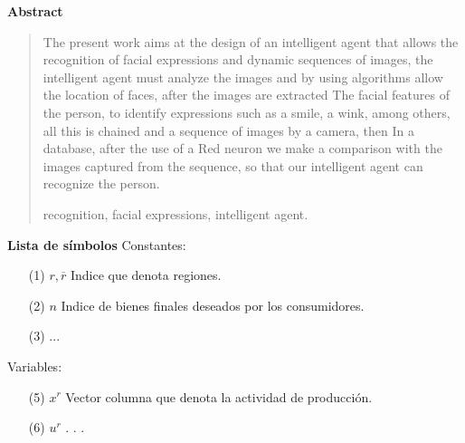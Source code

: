 \newpage
\begin{center}
 {\bf\LARGE Abstract}\vskip 1.5cm
\end{center} 
\begin{quotation}

The present work aims at the design of an intelligent agent that allows the recognition of facial expressions and dynamic sequences of images, the intelligent agent must analyze the images and by using algorithms allow the location of faces, after the images are extracted The facial features of the person, to identify expressions such as a smile, a wink, among others, all this is chained and a sequence of images by a camera, then In a database, after the use of a Red neuron we make a comparison with the images captured from the sequence, so that our intelligent agent can recognize the person.


\vskip 0.3cm
\hspace*{-0.6cm}{\bf Keywords:} recognition, facial expressions, intelligent agent.
\end{quotation}


\newpage
{}
 {\bf\LARGE Lista de símbolos}
 \vskip 1.5cm
Constantes: 
\begin{enumerate}
\item[(1)]$r,\overline{r} $ \hspace*{0.8cm} Indice que denota regiones.
\item[(2)] $n $ \hspace*{1.1cm} Indice de bienes finales deseados por los consumidores.
\item[(3)] ...
\vskip 3cm
\end{enumerate} 
\vskip 0.3cm
Variables:
\begin{enumerate}
\item[(5)] $ x^{r} $ \hspace*{1cm} Vector columna que denota la actividad de producción.
\item[(6)] $ u^{r} $ \hspace*{1.2cm} . . .
\end{enumerate}
